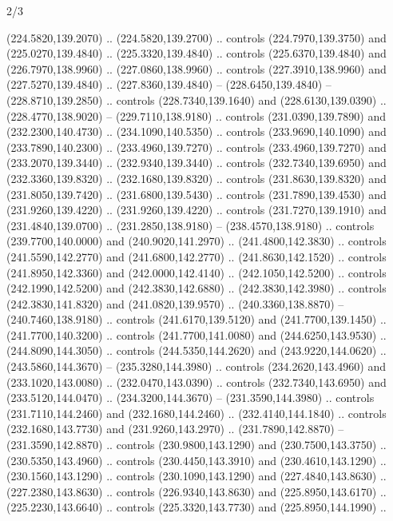 \begin{flagdescription}{2/3}
\begin{scope}[xshift=0.5\flaglength,yshift=0.5\flagwidth,scale=\flagwidth/259.2]
\begin{scope}[y=0.8pt, x=0.8pt, yscale=-1,shift={(-243,-162)}]
      (224.5820,139.2070) .. (224.5820,139.2700) .. controls (224.7970,139.3750) and
      (225.0270,139.4840) .. (225.3320,139.4840) .. controls (225.6370,139.4840) and
      (226.7970,138.9960) .. (227.0860,138.9960) .. controls (227.3910,138.9960) and
      (227.5270,139.4840) .. (227.8360,139.4840) -- (228.6450,139.4840) --
      (228.8710,139.2850) .. controls (228.7340,139.1640) and (228.6130,139.0390) ..
      (228.4770,138.9020) -- (229.7110,138.9180) .. controls (231.0390,139.7890) and
      (232.2300,140.4730) .. (234.1090,140.5350) .. controls (233.9690,140.1090) and
      (233.7890,140.2300) .. (233.4960,139.7270) .. controls (233.4960,139.7270) and
      (233.2070,139.3440) .. (232.9340,139.3440) .. controls (232.7340,139.6950) and
      (232.3360,139.8320) .. (232.1680,139.8320) .. controls (231.8630,139.8320) and
      (231.8050,139.7420) .. (231.6800,139.5430) .. controls (231.7890,139.4530) and
      (231.9260,139.4220) .. (231.9260,139.4220) .. controls (231.7270,139.1910) and
      (231.4840,139.0700) .. (231.2850,138.9180) -- (238.4570,138.9180) .. controls
      (239.7700,140.0000) and (240.9020,141.2970) .. (241.4800,142.3830) .. controls
      (241.5590,142.2770) and (241.6800,142.2770) .. (241.8630,142.1520) .. controls
      (241.8950,142.3360) and (242.0000,142.4140) .. (242.1050,142.5200) .. controls
      (242.1990,142.5200) and (242.3830,142.6880) .. (242.3830,142.3980) .. controls
      (242.3830,141.8320) and (241.0820,139.9570) .. (240.3360,138.8870) --
      (240.7460,138.9180) .. controls (241.6170,139.5120) and (241.7700,139.1450) ..
      (241.7700,140.3200) .. controls (241.7700,141.0080) and (244.6250,143.9530) ..
      (244.8090,144.3050) .. controls (244.5350,144.2620) and (243.9220,144.0620) ..
      (243.5860,144.3670) -- (235.3280,144.3980) .. controls (234.2620,143.4960) and
      (233.1020,143.0080) .. (232.0470,143.0390) .. controls (232.7340,143.6950) and
      (233.5120,144.0470) .. (234.3200,144.3670) -- (231.3590,144.3980) .. controls
      (231.7110,144.2460) and (232.1680,144.2460) .. (232.4140,144.1840) .. controls
      (232.1680,143.7730) and (231.9260,143.2970) .. (231.7890,142.8870) --
      (231.3590,142.8870) .. controls (230.9800,143.1290) and (230.7500,143.3750) ..
      (230.5350,143.4960) .. controls (230.4450,143.3910) and (230.4610,143.1290) ..
      (230.1560,143.1290) .. controls (230.1090,143.1290) and (227.4840,143.8630) ..
      (227.2380,143.8630) .. controls (226.9340,143.8630) and (225.8950,143.6170) ..
      (225.2230,143.6640) .. controls (225.3320,143.7730) and (225.8950,144.1990) ..

\end{scope}
\end{scope}
\end{flagdescription}
